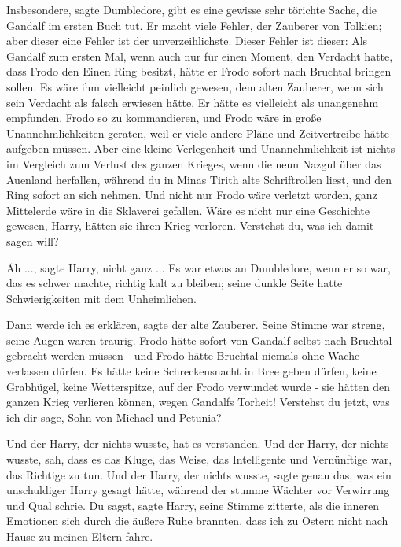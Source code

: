 \glqq{}Insbesondere\grqq{}, sagte Dumbledore, \glqq{}gibt es eine gewisse sehr
törichte Sache, die Gandalf im ersten Buch tut. Er macht viele Fehler, der
Zauberer von Tolkien; aber dieser eine Fehler ist der unverzeihlichste. Dieser
Fehler ist dieser: Als Gandalf zum ersten Mal, wenn auch nur für einen Moment,
den Verdacht hatte, dass Frodo den Einen Ring besitzt, hätte er Frodo sofort
nach Bruchtal bringen sollen. Es wäre ihm vielleicht peinlich gewesen, dem alten
Zauberer, wenn sich sein Verdacht als falsch erwiesen hätte. Er hätte es
vielleicht als unangenehm empfunden, Frodo so zu kommandieren, und Frodo wäre in
große Unannehmlichkeiten geraten, weil er viele andere Pläne und Zeitvertreibe
hätte aufgeben müssen. Aber eine kleine Verlegenheit und Unannehmlichkeit ist
nichts im Vergleich zum Verlust des ganzen Krieges, wenn die neun Nazgul über
das Auenland herfallen, während du in Minas Tirith alte Schriftrollen liest, und
den Ring sofort an sich nehmen. Und nicht nur Frodo wäre verletzt worden, ganz
Mittelerde wäre in die Sklaverei gefallen. Wäre es nicht nur eine Geschichte
gewesen, Harry, hätten sie ihren Krieg verloren. Verstehst du, was ich damit
sagen will?\grqq{}

\glqq{}Äh ...\grqq{}, sagte Harry, \glqq{}nicht ganz ...\grqq{} Es war etwas an
Dumbledore, wenn er so war, das es schwer machte, richtig kalt zu bleiben; seine
dunkle Seite hatte Schwierigkeiten mit dem Unheimlichen.

\glqq{}Dann werde ich es erklären\grqq{}, sagte der alte Zauberer. Seine Stimme
war streng, seine Augen waren traurig. \glqq{}Frodo hätte sofort von Gandalf
selbst nach Bruchtal gebracht werden müssen - und Frodo hätte Bruchtal niemals
ohne Wache verlassen dürfen. Es hätte keine Schreckensnacht in Bree geben
dürfen, keine Grabhügel, keine Wetterspitze, auf der Frodo verwundet wurde - sie
hätten den ganzen Krieg verlieren können, wegen Gandalfs Torheit! Verstehst du
jetzt, was ich dir sage, Sohn von Michael und Petunia?\grqq{}

Und der Harry, der nichts wusste, hat es verstanden. Und der Harry, der nichts
wusste, sah, dass es das Kluge, das Weise, das Intelligente und Vernünftige war,
das Richtige zu tun. Und der Harry, der nichts wusste, sagte genau das, was ein
unschuldiger Harry gesagt hätte, während der stumme Wächter vor Verwirrung und
Qual schrie. \glqq{}Du sagst\grqq{}, sagte Harry, seine Stimme zitterte, als die
inneren Emotionen sich durch die äußere Ruhe brannten, \glqq{}dass ich zu Ostern
nicht nach Hause zu meinen Eltern fahre.\grqq{}

